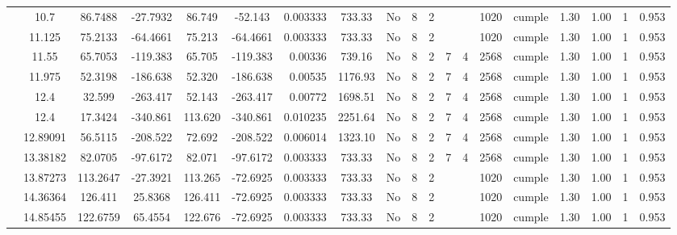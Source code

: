 \begin{table}[H]
{\begin{tabular}{|c|c|c|c|c|c|r|c|c|c|c|c|c|c|c|c|c|c|c|}
\cline{2-19}        & 10.7 & 86.7488 & -27.7932 & 86.749 & -52.143 & 0.003333 & 733.33 & No  & 8   & 2   &     &     & 1020 & \cellcolor[rgb]{ .776,  .937,  .808}cumple & 1.30 & 1.00 & 1   & 0.953 \bigstrut\\
\cline{2-19}        & 11.125 & 75.2133 & -64.4661 & 75.213 & -64.4661 & 0.003333 & 733.33 & No  & 8   & 2   &     &     & 1020 & \cellcolor[rgb]{ .776,  .937,  .808}cumple & 1.30 & 1.00 & 1   & 0.953 \bigstrut\\
\cline{2-19}        & 11.55 & 65.7053 & -119.383 & 65.705 & -119.383 & 0.00336 & 739.16 & No  & 8   & 2   & 7   & 4   & 2568 & \cellcolor[rgb]{ .776,  .937,  .808}cumple & 1.30 & 1.00 & 1   & 0.953 \bigstrut\\
\cline{2-19}        & 11.975 & 52.3198 & -186.638 & 52.320 & -186.638 & 0.00535 & 1176.93 & No  & 8   & 2   & 7   & 4   & 2568 & \cellcolor[rgb]{ .776,  .937,  .808}cumple & 1.30 & 1.00 & 1   & 0.953 \bigstrut\\
\cline{2-19}        & \cellcolor[rgb]{ .851,  .882,  .949}12.4 & 32.599 & -263.417 & 52.143 & -263.417 & 0.00772 & 1698.51 & No  & 8   & 2   & 7   & 4   & 2568 & \cellcolor[rgb]{ .776,  .937,  .808}cumple & 1.30 & 1.00 & 1   & 0.953 \bigstrut\\
\cline{2-19}        & \cellcolor[rgb]{ .851,  .882,  .949}12.4 & 17.3424 & -340.861 & 113.620 & -340.861 & 0.010235 & 2251.64 & No  & 8   & 2   & 7   & 4   & 2568 & \cellcolor[rgb]{ .776,  .937,  .808}cumple & 1.30 & 1.00 & 1   & 0.953 \bigstrut\\
\cline{2-19}        & 12.89091 & 56.5115 & -208.522 & 72.692 & -208.522 & 0.006014 & 1323.10 & No  & 8   & 2   & 7   & 4   & 2568 & \cellcolor[rgb]{ .776,  .937,  .808}cumple & 1.30 & 1.00 & 1   & 0.953 \bigstrut\\
\cline{2-19}        & 13.38182 & 82.0705 & -97.6172 & 82.071 & -97.6172 & 0.003333 & 733.33 & No  & 8   & 2   & 7   & 4   & 2568 & \cellcolor[rgb]{ .776,  .937,  .808}cumple & 1.30 & 1.00 & 1   & 0.953 \bigstrut\\
\cline{2-19}        & 13.87273 & 113.2647 & -27.3921 & 113.265 & -72.6925 & 0.003333 & 733.33 & No  & 8   & 2   &     &     & 1020 & \cellcolor[rgb]{ .776,  .937,  .808}cumple & 1.30 & 1.00 & 1   & 0.953 \bigstrut\\
\cline{2-19}        & 14.36364 & 126.411 & 25.8368 & 126.411 & -72.6925 & 0.003333 & 733.33 & No  & 8   & 2   &     &     & 1020 & \cellcolor[rgb]{ .776,  .937,  .808}cumple & 1.30 & 1.00 & 1   & 0.953 \bigstrut\\
\cline{2-19}        & 14.85455 & 122.6759 & 65.4554 & 122.676 & -72.6925 & 0.003333 & 733.33 & No  & 8   & 2   &     &     & 1020 & \cellcolor[rgb]{ .776,  .937,  .808}cumple & 1.30 & 1.00 & 1   & 0.953 \bigstrut\\

\end{tabular}}
\end{table}
